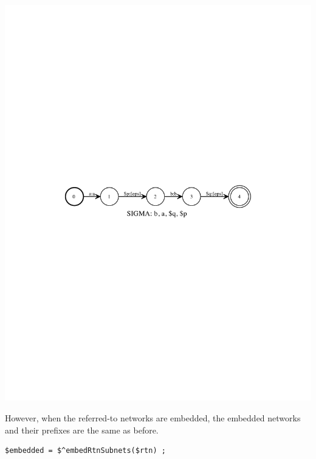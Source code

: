 \documentclass[letterpaper,12pt]{article}
\begin{document}
\begin{center}
\includegraphics[width=\textwidth]{images/sapEpsTwoReferences.pdf}
\end{center}

However, when the referred-to networks are embedded, the embedded networks and their
prefixes are the same as before.

\begin{Verbatim}[fontsize=\small]
$embedded = $^embedRtnSubnets($rtn) ;
\end{Verbatim}
\end{document}
